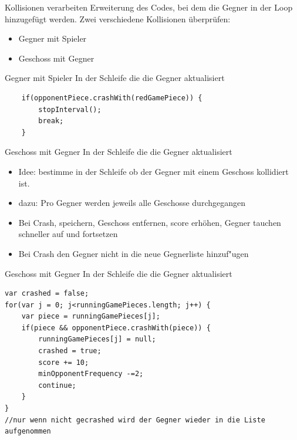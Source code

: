 \documentclass[18pt]{beamer}
\begin{document}
\begin{frame}{Kollisionen verarbeiten}
Erweiterung des Codes, bei dem die Gegner in der Loop hinzugefügt werden.
Zwei verschiedene Kollisionen überprüfen:
\begin{itemize}
	\item Gegner mit Spieler
	\item Geschoss mit Gegner
\end{itemize}
\end{frame}

\begin{frame}[fragile]{Gegner mit Spieler}
In der Schleife die die Gegner aktualisiert
\begin{lstlisting}
	if(opponentPiece.crashWith(redGamePiece)) {
		stopInterval();
		break;
	}
\end{lstlisting}
\end{frame}

\begin{frame}{Geschoss mit Gegner}
In der Schleife die die Gegner aktualisiert
\begin{itemize}
	\item Idee: bestimme in der Schleife ob der Gegner mit einem Geschoss kollidiert ist.
	\item dazu: Pro Gegner werden jeweils alle Geschosse durchgegangen
	\item Bei Crash, speichern, Geschoss entfernen, score erhöhen, Gegner tauchen schneller auf und fortsetzen
	\item Bei Crash den Gegner nicht in die neue Gegnerliste hinzuf"ugen
\end{itemize}
\end{frame}

\begin{frame}[fragile]{Geschoss mit Gegner}
In der Schleife die die Gegner aktualisiert
\begin{lstlisting}
var crashed = false;
for(var j = 0; j<runningGamePieces.length; j++) {
	var piece = runningGamePieces[j];
	if(piece && opponentPiece.crashWith(piece)) {
		runningGamePieces[j] = null;
		crashed = true;
		score += 10;
		minOpponentFrequency -=2;
		continue;
	}
}
//nur wenn nicht gecrashed wird der Gegner wieder in die Liste aufgenommen
\end{lstlisting}
\end{frame}
\end{document}
